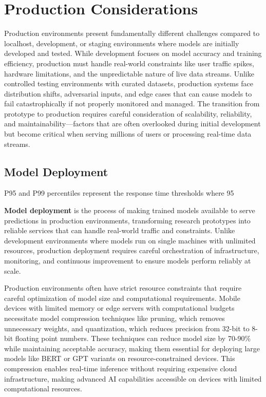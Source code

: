 
\section{Production Considerations }
\label{sec:production}

Production environments present fundamentally different challenges compared to localhost, development, or staging environments where models are initially developed and tested. While development focuses on model accuracy and training efficiency, production must handle real-world constraints like user traffic spikes, hardware limitations, and the unpredictable nature of live data streams. Unlike controlled testing environments with curated datasets, production systems face distribution shifts, adversarial inputs, and edge cases that can cause models to fail catastrophically if not properly monitored and managed. The transition from prototype to production requires careful consideration of scalability, reliability, and maintainability—factors that are often overlooked during initial development but become critical when serving millions of users or processing real-time data streams.

\subsection{Model Deployment}

\begin{remark}
P95 and P99 percentiles represent the response time thresholds where 95%
\end{remark}

\textbf{Model deployment} is the process of making trained models available to serve predictions in production environments, transforming research prototypes into reliable services that can handle real-world traffic and constraints. Unlike development environments where models run on single machines with unlimited resources, production deployment requires careful orchestration of infrastructure, monitoring, and continuous improvement to ensure models perform reliably at scale.

Production environments often have strict resource constraints that require careful optimization of model size and computational requirements. Mobile devices with limited memory or edge servers with computational budgets necessitate model compression techniques like pruning, which removes unnecessary weights, and quantization, which reduces precision from 32-bit to 8-bit floating point numbers. These techniques can reduce model size by 70-90\% while maintaining acceptable accuracy, making them essential for deploying large models like BERT or GPT variants on resource-constrained devices. This compression enables real-time inference without requiring expensive cloud infrastructure, making advanced AI capabilities accessible on devices with limited computational resources.

